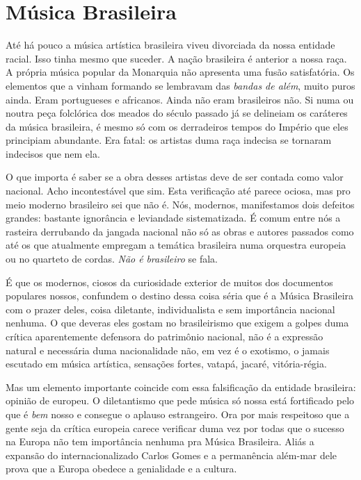 \section{Música Brasileira}

Até há pouco a música artística brasileira viveu divorciada da nossa
entidade racial. Isso tinha mesmo que suceder. A nação brasileira é
anterior a nossa raça. A própria música popular da Monarquia não
apresenta uma fusão satisfatória. Os elementos que a vinham formando se
lembravam das \emph{bandas de além}, muito puros ainda. Eram portugueses
e africanos. Ainda não eram brasileiros não. Si numa ou noutra peça
folclórica dos meados do século passado já se delineiam os caráteres da
música brasileira, é mesmo só com os derradeiros tempos do Império que
eles principiam abundante. Era fatal: os artistas duma raça indecisa se
tornaram indecisos que nem ela.~

O que importa é saber se a obra desses artistas deve de ser contada como
valor nacional. Acho incontestável que sim. Esta verificação até parece
ociosa, mas pro meio moderno brasileiro sei que não
é. Nós, modernos, manifestamos dois defeitos grandes:
bastante ignorância e leviandade sistematizada. É comum entre nós a
rasteira derrubando da jangada nacional não só as obras e autores
passados como até os que atualmente empregam a temática brasileira numa
orquestra europeia ou no quarteto de cordas. \emph{Não é}
\emph{brasileiro} se fala.

É que os modernos, ciosos da curiosidade exterior de muitos dos
documentos populares nossos, confundem o destino dessa coisa séria que é
a Música Brasileira com o prazer deles, coisa diletante, individualista
e sem importância nacional nenhuma. O que deveras eles gostam no
brasileirismo que exigem a golpes duma crítica aparentemente defensora
do patrimônio nacional, não é a expressão natural e necessária duma
nacionalidade não, em vez é o exotismo, o jamais escutado em música
artística, sensações fortes, vatapá, jacaré, vitória-régia.

Mas um elemento importante coincide com essa falsificação da entidade
brasileira: opinião de europeu. O diletantismo que pede música só nossa
está fortificado pelo que é \emph{bem} nosso e consegue o aplauso
estrangeiro. Ora por mais respeitoso que a gente seja da crítica
europeia carece verificar duma vez por todas que o sucesso na Europa não
tem importância nenhuma pra Música Brasileira. Aliás a expansão do
internacionalizado Carlos Gomes e a permanência além-mar dele prova que
a Europa obedece a genialidade e a cultura.~

